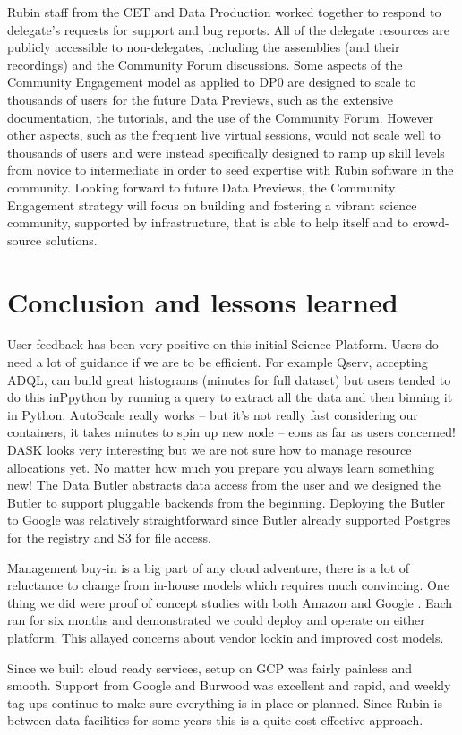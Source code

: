 \documentclass[11pt,twoside]{article}
\begin{document}
Rubin staff from the CET and Data Production worked together to respond to delegate's requests for support and bug reports.
All of the delegate resources are publicly accessible to non-delegates, including the assemblies (and their recordings) and the Community Forum discussions.
Some aspects of the Community Engagement model as applied to DP0 are designed to scale to thousands of users for the future Data Previews, such as the extensive documentation, the tutorials, and the use of the Community Forum.
However other aspects, such as the frequent live virtual sessions, would not scale well to thousands of users and were instead specifically designed to ramp up skill levels from novice to intermediate in order to seed expertise with Rubin software in the community.
Looking forward to future Data Previews, the Community Engagement strategy will focus on building and fostering a vibrant science community,
supported by infrastructure, that is able to help itself and to crowd-source solutions.

\section{Conclusion and lessons learned}
User feedback has been very positive on this initial Science Platform.
Users do need a lot of guidance if we are to be efficient.
For example Qserv, accepting ADQL, can build great histograms (minutes for full dataset) but users
tended to do this inPpython by running a query to extract all the data and then binning it in Python.
AutoScale really works -- but it's not really fast considering our containers, it takes minutes to spin up new node -- eons as far as users concerned!
DASK looks very interesting but we are not sure how to manage resource allocations yet.
No matter how much you prepare you always learn something new!
The Data Butler abstracts data access from the user and we designed the Butler to support pluggable backends from the beginning.
Deploying the Butler to Google was relatively straightforward since Butler already supported Postgres for the registry and S3 for file access.

Management buy-in is a big part of any cloud adventure, there is a lot of reluctance to change from in-house models
which requires much convincing. One thing we did were proof of concept studies with both Amazon \citep{2020arXiv201106044B,DMTN-137} and Google \citep{DMTN-125}. Each ran for six months and demonstrated we could deploy and operate on either platform. This allayed concerns about vendor lockin and improved cost models.

Since we built cloud ready services, setup on GCP was fairly painless and smooth.
Support from Google and Burwood was excellent and rapid, and weekly tag-ups continue to make sure everything is in place or planned.
Since Rubin is between data facilities for some years this is a quite cost effective approach.

\end{document}
